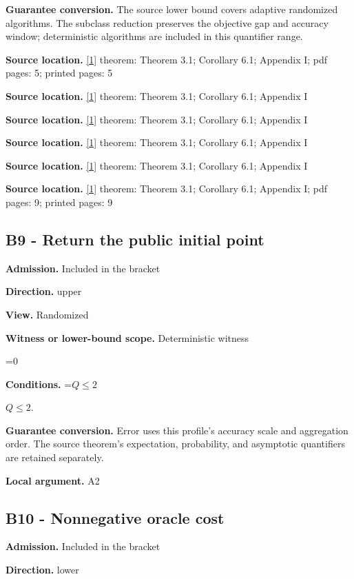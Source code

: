 \documentclass[10pt,a4paper]{article}
\newcommand{\AtlasMath}[1]{\par\begingroup\centering\setbox0=\hbox{$\displaystyle #1$}\ifdim\wd0>1.4\linewidth\typeout{ATLAS WIDE FORMULA: \the\wd0}\fi\ifdim\wd0>\linewidth\resizebox{\linewidth}{!}{\box0}\else\box0\fi\par\endgroup}
\newcommand{\AtlasInlineMath}[1]{\begingroup\setbox0=\hbox{$#1$}\ifdim\wd0>.4\linewidth\endgroup\AtlasMath{#1}\else\endgroup$#1$\fi}
\begin{document}
\textbf{Guarantee conversion.} The source lower bound covers adaptive randomized algorithms. The subclass reduction preserves the objective gap and accuracy window; deterministic algorithms are included in this quantifier range.

\textbf{Source location.} \href{https://arxiv.org/html/2610.00345v1}{[1]} theorem: Theorem 3.1; Corollary 6.1; Appendix I; pdf pages: 5; printed pages: 5

\textbf{Source location.} \href{https://arxiv.org/html/2610.00345v1}{[1]} theorem: Theorem 3.1; Corollary 6.1; Appendix I

\textbf{Source location.} \href{https://arxiv.org/html/2610.00345v1}{[1]} theorem: Theorem 3.1; Corollary 6.1; Appendix I

\textbf{Source location.} \href{https://arxiv.org/html/2610.00345v1}{[1]} theorem: Theorem 3.1; Corollary 6.1; Appendix I

\textbf{Source location.} \href{https://arxiv.org/html/2610.00345v1}{[1]} theorem: Theorem 3.1; Corollary 6.1; Appendix I

\textbf{Source location.} \href{https://arxiv.org/html/2610.00345v1}{[1]} theorem: Theorem 3.1; Corollary 6.1; Appendix I; pdf pages: 9; printed pages: 9

\subsection{B9 - Return the public initial point}
\textbf{Admission.} Included in the bracket

\textbf{Direction.} upper

\textbf{View.} Randomized

\textbf{Witness or lower-bound scope.} Deterministic witness

\AtlasMath{0}
\textbf{Conditions.} \AtlasInlineMath{Q\le2}.

\textbf{Guarantee conversion.} Error uses this profile's accuracy scale and aggregation order. The source theorem's expectation, probability, and asymptotic quantifiers are retained separately.

\textbf{Local argument.} A2

\subsection{B10 - Nonnegative oracle cost}
\textbf{Admission.} Included in the bracket

\textbf{Direction.} lower
\end{document}
